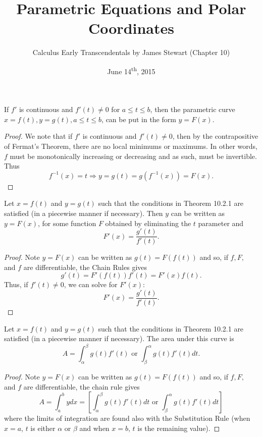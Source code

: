 \documentclass[a4paper,8pt]{article}
\title{Parametric Equations and Polar Coordinates}
\author{Calculus Early Transcendentals by James Stewart (Chapter 10)}
\date{June 14\textsuperscript{th}, 2015}
\begin{document}
\maketitle
{}

\begin{outline}

    If \(f'\) is continuous and \(f'(t) \neq 0\) for \(a \leq t \leq b\), then the parametric curve \(x = f(t),
    y = g(t), a \leq t \leq b\), can be put in the form \(y = F(x)\).

    \begin{proof}
      We note that if \(f'\) is continuous and \(f'(t) \neq 0\), then by the contrapositive of Fermat's Theorem,
      there are no local minimums or maximums. In other words, \(f\) must be monotonically increasing or decreasing
      and as such, must be invertible. Thus \[f^{-1}(x) = t \Rightarrow y = g(t) = g(f^{-1}(x)) = F(x)\text{.}\]
    \end{proof}

    Let \(x = f(t)\) and \(y = g(t)\) such that the conditions in Theorem 10.2.1 are satisfied (in a piecewise
    manner if necessary). Then \(y\) can be written as \(y = F(x)\), for some function \(F\) obtained by eliminating
    the \(t\) parameter and \[ F'(x) = \frac{g'(t)}{f'(t)}\text{.} \]

    \begin{proof}
      Note \(y = F(x)\) can be written as \( g(t) = F(f(t)) \) and so, if \(f, F,\) and \(f\) are differentiable,
      the Chain Rules gives \[ g'(t) = F'(f(t))f'(t) = F'(x)f(t)\text{.} \] Thus, if \(f'(t) \neq 0\), we can
      solve for \(F'(x)\): \[ F'(x) = \frac{g'(t)}{f'(t)}\text{.} \]
    \end{proof}

    Let \(x = f(t)\) and \(y = g(t)\) such that the conditions in Theorem 10.2.1 are satisfied (in a piecewise
    manner if necessary). The area under this curve is
    \[ A = \int_{\alpha}^{\beta} g(t)f'(t)\text{ or } \int_{\beta}^{\alpha} g(t)f'(t)dt\text{.} \]

    \begin{proof}
      Note \(y = F(x)\) can be written as \( g(t) = F(f(t)) \) and so, if \(f, F,\) and \(f\) are differentiable,
      the chain rule gives
      \[ A = \int_a^b ydx = \left[ \int_{\alpha}^{\beta} g(t)f'(t)dt \text{ or } \int_{\beta}^{\alpha} g(t)f'(t)dt \right] \]
      where the limits of integration
      are found also with the Substitution Rule (when \(x = a\), \(t\) is either \(\alpha\) or \(\beta\) and when
      \(x = b\), \(t\) is the remaining value).
    \end{proof}


\end{outline}
\end{document}

